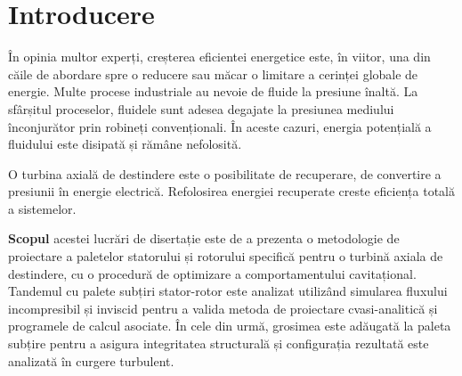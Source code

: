\chapter{Introducere}\label{chapter:introducere}

În opinia multor experți, creșterea eficientei energetice este, în viitor, una din căile de abordare spre o reducere sau măcar o limitare a cerinței globale de energie. Multe procese industriale au nevoie de fluide la presiune înaltă. La sfârșitul proceselor, fluidele sunt adesea degajate la presiunea mediului înconjurător prin robineți convenționali. În aceste cazuri, energia potențială a fluidului este disipată și rămâne nefolosită.

O turbina axială de destindere este o posibilitate de recuperare, de convertire a presiunii în energie electrică. Refolosirea energiei recuperate creste eficiența totală a sistemelor.

\textbf{Scopul} acestei lucrări de disertație este de a prezenta o metodologie de proiectare a paletelor statorului și rotorului specifică pentru o turbină axiala de destindere, cu o procedură de optimizare a comportamentului cavitațional.
Tandemul cu palete subțiri stator-rotor este analizat utilizând simularea fluxului incompresibil și inviscid pentru a valida metoda de proiectare cvasi-analitică și programele de calcul asociate. În cele din urmă, grosimea este adăugată la paleta subțire pentru a asigura integritatea structurală și configurația rezultată este analizată în curgere turbulent.